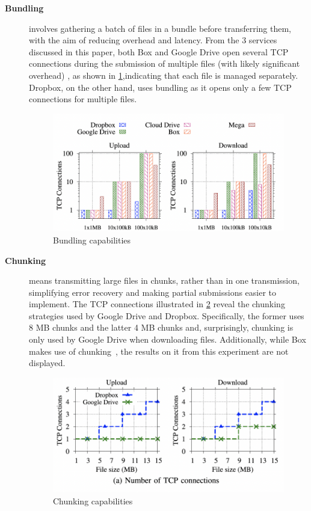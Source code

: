 \begin{description}
    \item[\textbf{Bundling}] involves gathering a batch of files in a bundle before transferring them, with the aim of reducing overhead and latency. From the 3 services discussed in this paper, both Box and Google Drive open several TCP connections during the submission of multiple files (with likely significant overhead) , as shown in  \ref{fig:bundling},indicating that each file is managed separately. Dropbox, on the other hand, uses bundling as it opens only a few TCP connections for multiple files.

    \begin{figure} [h]
        \centering
        \includegraphics[scale=0.7]{images/bundling}
        \caption{\label{fig:bundling}Bundling capabilities}
    \end{figure}

    \item[\textbf{Chunking}] means transmitting large files in chunks, rather than in one transmission, simplifying error recovery and making partial submissions easier to implement. The TCP connections illustrated in \ref{fig:chunking} reveal the chunking strategies used by Google Drive and Dropbox. Specifically, the former uses 8 MB chunks and the latter 4 MB chunks and, surprisingly, chunking is only used by Google Drive when downloading files. Additionally, while Box makes use of chunking~\cite{box_chunked}, the results on it from this experiment are not displayed.

    \begin{figure} [h]
        \centering
        \includegraphics[scale=0.7]{images/chunking}
        \caption{\label{fig:chunking}Chunking capabilities}
    \end{figure}


\end{description}
